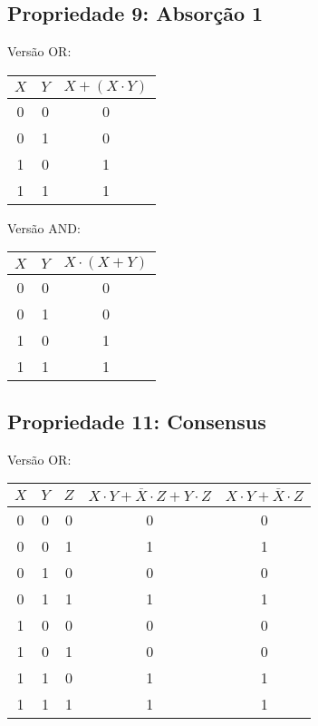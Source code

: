 \documentclass[12pt]{article}
\begin{document}
\subsection{Propriedade 9: Absorção 1}

Versão OR:
\begin{center}
\begin{tabular}{|c|c|c|}
\hline
$X$  & $Y$ & $X + (X \cdot  Y)$ \\
\hline
0 & 0 & 0 \\
0 & 1 & 0 \\
1 & 0 & 1 \\
1 & 1 & 1 \\
\hline
\end{tabular}
\end{center}

Versão AND:
\begin{center}
\begin{tabular}{|c|c|c|}
\hline
$X$  & $Y$ & $X \cdot (X + Y)$ \\
\hline
0 & 0 & 0 \\
0 & 1 & 0 \\
1 & 0 & 1 \\
1 & 1 & 1 \\
\hline
\end{tabular}
\end{center}

\subsection{Propriedade 11: Consensus}

Versão OR:
\begin{center}
\begin{tabular}{|c|c|c|c|c|}
\hline
$X$  & $Y$ & $Z$ & $X \cdot Y + \overline{X} \cdot Z + Y \cdot Z$ & $X \cdot Y + \overline{X} \cdot Z$ \\
\hline
0 & 0 & 0 & 0 & 0 \\
0 & 0 & 1 & 1 & 1 \\
0 & 1 & 0 & 0 & 0 \\
0 & 1 & 1 & 1 & 1 \\
1 & 0 & 0 & 0 & 0 \\
1 & 0 & 1 & 0 & 0 \\
1 & 1 & 0 & 1 & 1 \\
1 & 1 & 1 & 1 & 1 \\
\hline
\end{tabular}
\end{center}
\end{document}
